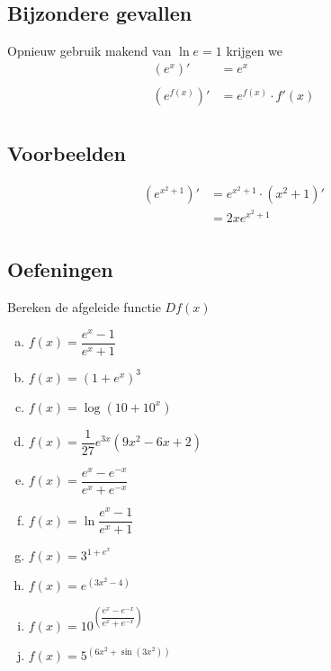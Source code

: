 \documentclass[12pt]{article}
\begin{document}
\begin{theorie}
\subsection{Bijzondere gevallen}
Opnieuw gebruik makend van $\ln e=1$ krijgen we
\begin{align*}
  \left(e^x\right)' &= e^x\\\\
  \left(e^{f(x)}\right)' &= e^{f(x)} \cdot f'(x)\\
\end{align*}

\subsection{Voorbeelden}

\begin{align*}
\left(e^{x^2+1}\right)' &= e^{x^2+1} \cdot (x^2+1)'\\
                        &= 2x e^{x^2+1}\\
\end{align*}

\subsection{Oefeningen}

\end{theorie}

\begin{oefening}
Bereken de afgeleide functie $Df(x)$
\begin{multicols}{2}
\begin{enumerate}[(a)]
  \itemsep0.8em
  \item $f(x)=\dfrac{e^x-1}{e^x+1}$
  \item $f(x)=(1+e^x)^3$
  \item $f(x)=\log(10+10^x)$
  \item $f(x)=\dfrac{1}{27}e^{3x}(9x^2-6x+2)$
  \item $f(x)=\dfrac{e^x-e^{-x}}{e^x+e^{-x}}$
  \item $f(x)=\ln\dfrac{e^x-1}{e^x+1}$
  \item $f(x)=3^{1+e^x}$
  \item $f(x)=e^{(3x^2-4)}$
  \item $f(x)=10^{\left(\dfrac{e^x-e^{-x}}{e^x+e^{-x}}\right)}$
  \item $f(x)=5^{\left(6x^2+\sin(3x^2)\right)}$
\end{enumerate}
\end{multicols}
\end{oefening}
\end{document}
